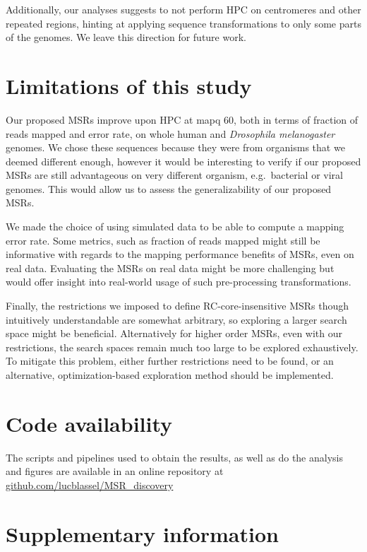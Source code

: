 \documentclass[
  11,
]{scrbook}
\begin{document}
Additionally, our analyses suggests to not perform HPC on centromeres
and other repeated regions, hinting at applying sequence transformations
to only some parts of the genomes. We leave this direction for future
work.

\hypertarget{limitations-of-this-study}{%
\section{Limitations of this study}\label{limitations-of-this-study}}

Our proposed MSRs improve upon HPC at mapq 60, both in terms of fraction
of reads mapped and error rate, on whole human and \emph{Drosophila
melanogaster} genomes. We chose these sequences because they were from
organisms that we deemed different enough, however it would be
interesting to verify if our proposed MSRs are still advantageous on
very different organism, e.g.~bacterial or viral genomes. This would
allow us to assess the generalizability of our proposed MSRs.

We made the choice of using simulated data to be able to compute a
mapping error rate. Some metrics, such as fraction of reads mapped might
still be informative with regards to the mapping performance benefits of
MSRs, even on real data. Evaluating the MSRs on real data might be more
challenging but would offer insight into real-world usage of such
pre-processing transformations.

Finally, the restrictions we imposed to define RC-core-insensitive MSRs
though intuitively understandable are somewhat arbitrary, so exploring a
larger search space might be beneficial. Alternatively for higher order
MSRs, even with our restrictions, the search spaces remain much too
large to be explored exhaustively. To mitigate this problem, either
further restrictions need to be found, or an alternative,
optimization-based exploration method should be implemented.

\hypertarget{code-availability}{%
\section{Code availability}\label{code-availability}}

The scripts and pipelines used to obtain the results, as well as do the
analysis and figures are available in an online repository at
\href{https://github.com/lucblassel/MSR_discovery}{github.com/lucblassel/MSR\_discovery}

\hypertarget{supplementary-information}{%
\section*{Supplementary information}\label{supplementary-information}}
\end{document}
